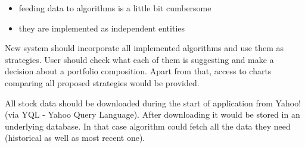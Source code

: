 \begin{itemize}
  \item feeding data to algorithms is a little bit cumbersome
  \item they are implemented as independent entities
\end{itemize}
 
New system should incorporate all implemented algorithms and use them as strategies.
User should check what each of them is suggesting and make a decision about a portfolio composition.
Apart from that, access to charts comparing all proposed strategies would be provided.


All stock data should be downloaded during the start of application from Yahoo! (via YQL - Yahoo Query Language).
After downloading it would be stored in an underlying database.
In that case algorithm could fetch all the data they need (historical as well as most recent one).
 

